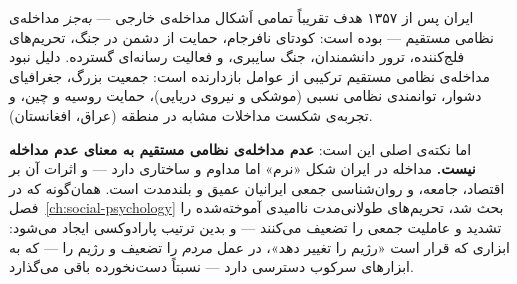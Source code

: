 ایران پس از ۱۳۵۷ هدف تقریباً تمامی اَشکال مداخله‌ی خارجی — \textit{به‌جز} مداخله‌ی نظامی مستقیم — بوده است: کودتای نافرجام، حمایت از دشمن در جنگ، تحریم‌های فلج‌کننده، ترور دانشمندان، جنگ سایبری، و فعالیت رسانه‌ای گسترده. دلیل نبود مداخله‌ی نظامی مستقیم ترکیبی از عوامل بازدارنده است: جمعیت بزرگ، جغرافیای دشوار، توانمندی نظامی نسبی (موشکی و نیروی دریایی)، حمایت روسیه و چین، و تجربه‌ی شکست مداخلات مشابه در منطقه (عراق، افغانستان).

اما نکته‌ی اصلی این است: \textbf{عدم مداخله‌ی نظامی مستقیم به معنای عدم مداخله نیست.} مداخله در ایران شکل «نرم» اما مداوم و ساختاری دارد — و اثرات آن بر اقتصاد، جامعه، و روان‌شناسی جمعی ایرانیان عمیق و بلندمدت است. همان‌گونه که در فصل~\ref{ch:social-psychology} بحث شد، تحریم‌های طولانی‌مدت ناامیدی آموخته‌شده را تشدید و عاملیت جمعی را تضعیف می‌کنند — و بدین ترتیب پارادوکسی ایجاد می‌شود: ابزاری که قرار است «رژیم را تغییر دهد»، در عمل \textit{مردم} را تضعیف و رژیم را — که به ابزارهای سرکوب دسترسی دارد — نسبتاً دست‌نخورده باقی می‌گذارد.

\cleardoublepage